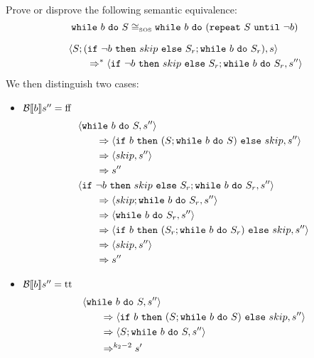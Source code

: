 \begin{exercise}{
    Prove or disprove the following semantic equivalence:
    \[ \texttt{while}\ b\ \texttt{do}\ S \cong_{\text{\tiny SOS}} \texttt{while}\ b\ \texttt{do}\ (\texttt{repeat}\ S\ \texttt{until}\ \neg b)  \]\vspace*{-0.6cm}
}
\begin{itemize}
\begin{itemize}
\begin{itemize}
\begin{align*}
                                &\left<S;(\texttt{if}\ \neg b\ \texttt{then}\ skip\ \texttt{else}\ S_r; \texttt{while}\ b\ \texttt{do}\ S_r), s\right>
                                \\&\qquad\Rightarrow^* \left<\texttt{if}\ \neg b\ \texttt{then}\ skip\ \texttt{else}\ S_r; \texttt{while}\ b\ \texttt{do}\ S_r, s''\right>
                            \end{align*}
                            We then distinguish two cases:
                            \begin{itemize}
                                \item $\mathcal{B} \llbracket b \rrbracket s'' = \text{ff}$
                                    \begin{align*}
                                        &\left<\texttt{while}\ b\ \texttt{do}\ S, s''\right>
                                        \\&\qquad\Rightarrow \left<\texttt{if}\ b\ \texttt{then}\ (S; \texttt{while}\ b\ \texttt{do}\ S)\ \texttt{else}\ skip, s''\right>
                                        \\&\qquad\Rightarrow \left<skip, s''\right>
                                        \\&\qquad\Rightarrow s''
                                        \\
                                        &\left<\texttt{if}\ \neg b\ \texttt{then}\ skip\ \texttt{else}\ S_r; \texttt{while}\ b\ \texttt{do}\ S_r, s''\right>
                                        \\&\qquad\Rightarrow \left<skip; \texttt{while}\ b\ \texttt{do}\ S_r, s''\right>
                                        \\&\qquad\Rightarrow \left<\texttt{while}\ b\ \texttt{do}\ S_r, s''\right>
                                        \\&\qquad\Rightarrow \left<\texttt{if}\ b\ \texttt{then}\ (S_r; \texttt{while}\ b\ \texttt{do}\ S_r)\ \texttt{else}\ skip, s''\right>
                                        \\&\qquad\Rightarrow \left<skip, s''\right>
                                        \\&\qquad\Rightarrow s''
                                    \end{align*}
                                \item $\mathcal{B} \llbracket b \rrbracket s'' = \text{tt}$
                                    \begin{align*}
                                        &\instr{\wwhile{b}{S}}{s''}
                                        \\&\qquad\Rightarrow \instr{\wif{b}{(S; \wwhile{b}{S})}{skip}}{s''}
                                        \\&\qquad\Rightarrow \instr{S; \wwhile{b}{S}}{s''}
                                        \\&\qquad\Rightarrow^{k_2 - 2} s'

\end{align*}
\end{itemize}
\end{itemize}
\end{itemize}
\end{itemize}
\end{exercise}
